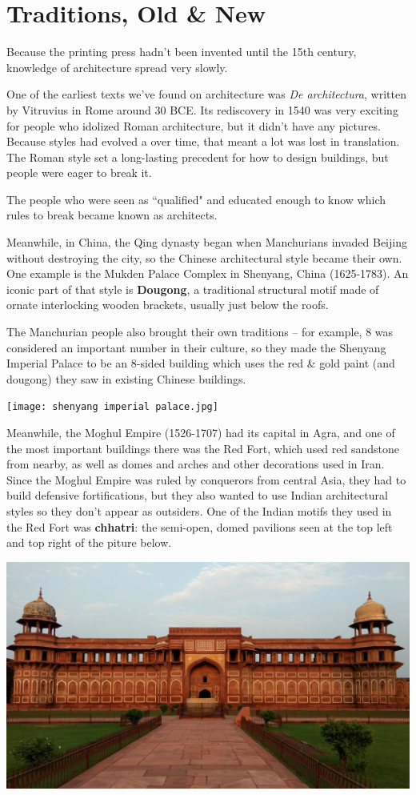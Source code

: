\documentclass[class=article, crop=false]{standalone}
\begin{document}
\section{Traditions, Old \& New}
Because the printing press hadn't been invented until the 15th century, knowledge of architecture spread very slowly.
\par
One of the earliest texts we've found on architecture was \textit{De architectura}, written by Vitruvius in Rome around 30 BCE. Its rediscovery in 1540 was very exciting for people who idolized Roman architecture, but it didn't have any pictures. Because styles had evolved a over time, that meant a lot was lost in translation. The Roman style set a long-lasting precedent for how to design buildings, but people were eager to break it.
\par
The people who were seen as ``qualified" and educated enough to know which rules to break became known as architects.
\par
Meanwhile, in China, the Qing dynasty began when Manchurians invaded Beijing without destroying the city, so the Chinese architectural style became their own. One example is the Mukden Palace Complex in Shenyang, China (1625-1783). An iconic part of that style is \textbf{Dougong}, a traditional structural motif made of ornate interlocking wooden brackets, usually just below the roofs.
\par
The Manchurian people also brought their own traditions -- for example, 8 was considered an important number in their culture, so they made the Shenyang Imperial Palace to be an 8-sided building which uses the red \& gold paint (and dougong) they saw in existing Chinese buildings.
\begin{center}
    \texttt{[image: shenyang imperial palace.jpg]}
\end{center}
Meanwhile, the Moghul Empire (1526-1707) had its capital in Agra, and one of the most important buildings there was the Red Fort, which used red sandstone from nearby, as well as domes and arches and other decorations used in Iran. Since the Moghul Empire was ruled by conquerors from central Asia, they had to build defensive fortifications, but they also wanted to use Indian architectural styles so they don't appear as outsiders. One of the Indian motifs they used in the Red Fort was \textbf{chhatri}: the semi-open, domed pavilions seen at the top left and top right of the piture below.
\begin{center}
    \includegraphics[width=\textwidth]{Jehangir Mahal.jpg}
\end{center}
\end{document}
